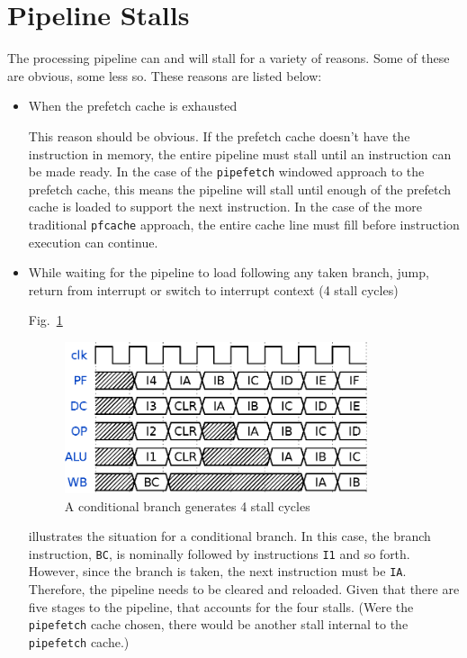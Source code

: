 \documentclass{gqtekspec}
\begin{document}
\section{Pipeline Stalls}
The processing pipeline can and will stall for a variety of reasons.  Some of
these are obvious, some less so.  These reasons are listed below:
\begin{itemize}
\item When the prefetch cache is exhausted

This reason should be obvious.  If the prefetch cache doesn't have the
instruction in memory, the entire pipeline must stall until an instruction
can be made ready.  In the case of the {\tt pipefetch} windowed approach
to the prefetch cache, this means the pipeline will stall until enough of the
prefetch cache is loaded to support the next instruction.  In the case
of the more traditional {\tt pfcache} approach, the entire cache line must
fill before instruction execution can continue.

\item While waiting for the pipeline to load following any taken branch, jump,
	return from interrupt or switch to interrupt context (4 stall cycles)

Fig.~\ref{fig:bcstalls}
\begin{figure}\begin{center}
\includegraphics[width=3.5in]{../gfx/bc.eps}
\caption{A conditional branch generates 4 stall cycles}\label{fig:bcstalls}
\end{center}\end{figure}
illustrates the situation for a conditional branch.  In this case, the branch
instruction, {\tt BC}, is nominally followed by instructions {\tt I1} and so
forth.  However, since the branch is taken, the next instruction must be
{\tt IA}.  Therefore, the pipeline needs to be cleared and reloaded.
Given that there are five stages to the pipeline, that accounts
for the four stalls.  (Were the {\tt pipefetch} cache chosen, there would
be another stall internal to the {\tt pipefetch} cache.)


\end{itemize}
\end{document}
